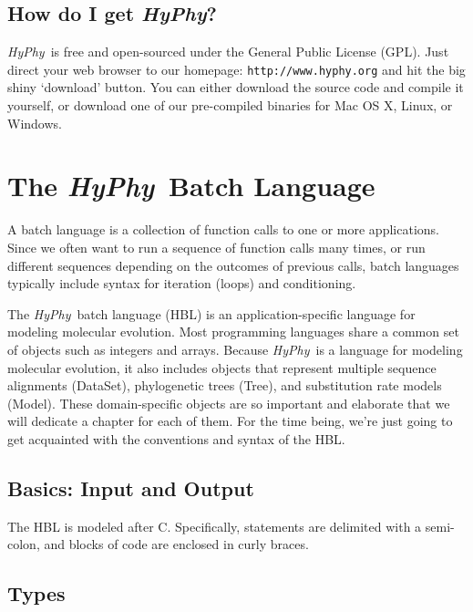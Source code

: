 \documentclass[12pt]{book}
\newcommand{\hyphy}{\textit{HyPhy}}
\begin{document}
\section {How do I get \hyphy?}

\hyphy\ is free and open-sourced under the General Public License (GPL).  Just direct your web browser to our homepage: {\tt http://www.hyphy.org} and hit the big shiny `download' button.  You can either download the source code and compile it yourself, or download one of our pre-compiled binaries for Mac OS X, Linux, or Windows.  
\vspace{1em}




\chapter {The \hyphy\ Batch Language}

A batch language is a collection of function calls to one or more applications.  Since we often want to run a sequence of function calls many times, or run different sequences depending on the outcomes of previous calls, batch languages typically include syntax for iteration (loops) and conditioning.

The \hyphy\ batch language (HBL) is an application-specific language for modeling molecular evolution.  Most programming languages share a common set of objects such as integers and arrays.  Because \hyphy\ is a language for modeling molecular evolution, it also includes objects that represent multiple sequence alignments (DataSet), phylogenetic trees (Tree), and substitution rate models (Model).  These domain-specific objects are so important and elaborate that we will dedicate a chapter for each of them.  For the time being, we're just going to get acquainted with the conventions and syntax of the HBL. 



\section {Basics: Input and Output}

The HBL is modeled after C.  Specifically, statements are delimited with a semi-colon, and blocks of code are enclosed in curly braces.


\section {Types}
\end{document}

